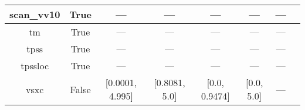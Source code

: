\begin{tabular}{|c|c|c|c|c|c|c|l|}
   scan\_vv10 &                  True &              --- &              --- &              --- &            --- &        --- &                                                      \cite{Brandenburg2016_115144} \\ \hline
           tm &                  True &              --- &              --- &              --- &            --- &        --- &                                                              \cite{Tao2016_073001} \\ \hline
         tpss &                  True &              --- &              --- &              --- &            --- &        --- &                                              \cite{Tao2003_146401,Perdew2004_6898} \\ \hline
      tpssloc &                  True &              --- &              --- &              --- &            --- &        --- &                                                       \cite{Constantin2012_035130} \\ \hline
         vsxc &                 False &  [0.0001, 4.995] &    [0.8081, 5.0] &    [0.0, 0.9474] &     [0.0, 5.0] &        --- &                                                          \cite{VanVoorhis1998_400} \\ \hline
\end{tabular}